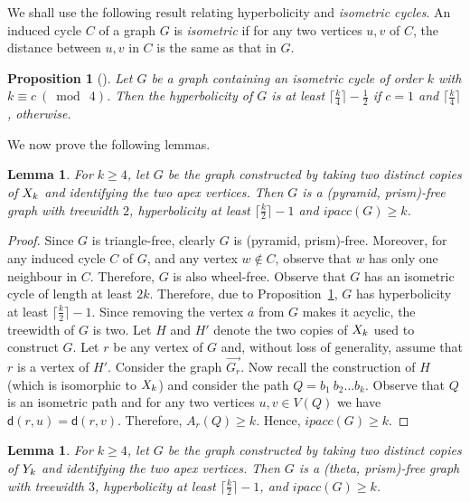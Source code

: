 \documentclass[a4paper]{article}
\newcommand{\dist}[2]{\mathsf{d}\left(#1,#2\right)}
\newcommand{\anticp}[2]{A_{#1}\left(#2\right)}
\newcommand{\ipac}[1]{ipacc\left(#1\right)}
\newtheorem{proposition}[theorem]{Proposition}
\newtheorem{lemma}[theorem]{Lemma}
\begin{document}
 We shall use the following result relating hyperbolicity and \emph{isometric cycles}. An induced cycle $C$ of a graph $G$ is \emph{isometric} if for any two vertices $u,v$ of $C$, the distance between $u,v$ in $C$ is the same as that in $G$.

 \begin{proposition}[\cite{wu2011hyperbolicity}]\label{prp:isometric-cycle}
 Let $G$ be a graph containing an isometric cycle of order $k$ with $k \equiv c~(\bmod~4)$. Then the hyperbolicity of $G$ is at least $\lceil\frac{k}{4}\rceil - \frac{1}{2}$ if $c=1$ and $\lceil\frac{k}{4}\rceil$, otherwise.
 \end{proposition}


We now prove the following lemmas.



\begin{lemma}\label{lem:lower-1}
For $k\geq 4$, let $G$ be the graph constructed by taking two distinct copies of $X_{k}$ and identifying the two apex vertices. Then $G$ is a (pyramid, prism)-free graph with treewidth $2$, hyperbolicity at least $\lceil\frac{k}{2}\rceil-1$ and $\ipac{G} \geq k$.
\end{lemma}
 \begin{proof}
 Since $G$ is triangle-free, clearly $G$ is (pyramid, prism)-free. Moreover, for any induced cycle $C$ of $G$, and any vertex $w\notin C$, observe that $w$ has only one neighbour in $C$. Therefore, $G$ is also wheel-free. Observe that $G$ has an isometric cycle of length at least $2k$. Therefore, due to Proposition~\ref{prp:isometric-cycle}, $G$ has hyperbolicity at least $\lceil\frac{k}{2}\rceil-1$. Since removing the vertex $a$ from $G$ makes it acyclic, the treewidth of $G$ is two. Let $H$ and $H'$ denote the two copies of $X_{k}$ used to construct $G$. Let $r$ be any vertex of $G$ and, without loss of generality, assume that $r$ is a vertex of $H'$. Consider the graph $\overrightarrow{G_r}$. Now recall the construction of $H$ (which is isomorphic to $X_{k}$) and consider the path $Q=b_1~b_2\ldots b_k$. Observe that $Q$ is an isometric path and for any two vertices $u,v\in V(Q)$ we have $\dist{r}{u}=\dist{r}{v}$. Therefore, $\anticp{r}{Q} \geq k$. Hence, $\ipac{G} \geq k$. 
 \end{proof}




\begin{lemma}\label{lem:lower-2}
For $k\geq 4$, let $G$ be the graph constructed by taking two distinct copies of $Y_{k}$ and identifying the two apex vertices. Then $G$ is a (theta, prism)-free graph with treewidth $3$, hyperbolicity at least $\lceil\frac{k}{2}\rceil-1$, and $\ipac{G} \geq k$.
\end{lemma}
\end{document}

